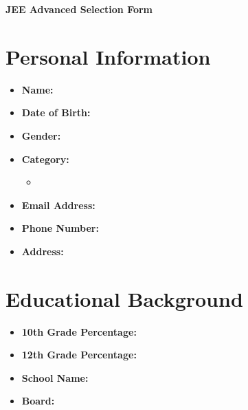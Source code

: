 \documentclass{article}
\begin{document}
\begin{center}

    
    \textbf{\huge JEE Advanced Selection Form}
\end{center}

\section*{Personal Information}
\begin{itemize}[leftmargin=*, label={}, itemsep=5pt]
    \item \textbf{Name:} \underline{\hspace{8cm}}
    \item \textbf{Date of Birth:} \underline{\hspace{8cm}}
    \item \textbf{Gender:} \underline{\hspace{8cm}}
    \item \textbf{Category:} 
        \begin{itemize}[label={\CheckBox[bordercolor = 0 0 0,  ][checked]{}}]
            \item {} \hspace{0.5cm}   \hspace{0.5cm}   \hspace{0.5cm}  
        \end{itemize}
    \item \textbf{Email Address:} \underline{\hspace{8cm}}
    \item \textbf{Phone Number:} \underline{\hspace{8cm}}
    \item \textbf{Address:} \underline{\hspace{8cm}}
\end{itemize}

\section*{Educational Background}
\begin{itemize}[leftmargin=*, label={}, itemsep=5pt]
    \item \textbf{10th Grade Percentage:} \underline{\hspace{8cm}}
    \item \textbf{12th Grade Percentage:} \underline{\hspace{8cm}}
    \item \textbf{School Name:} \underline{\hspace{8cm}}
    \item \textbf{Board:} \underline{\hspace{8cm}}
\end{itemize}
\end{document}
